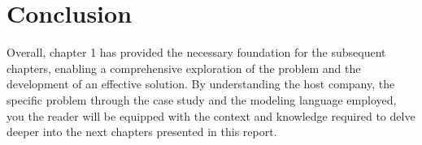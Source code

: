 \section*{\fontsize{15}{18}\selectfont Conclusion}

\hspace*{\parindent}Overall, chapter 1 has provided the necessary foundation for the subsequent chapters, enabling a
comprehensive exploration of the problem and the development of an effective solution. By understanding the host company, the specific problem through the case study and the modeling language
employed, you the reader will be equipped with the context and knowledge required to delve deeper
into the next chapters presented in this report.